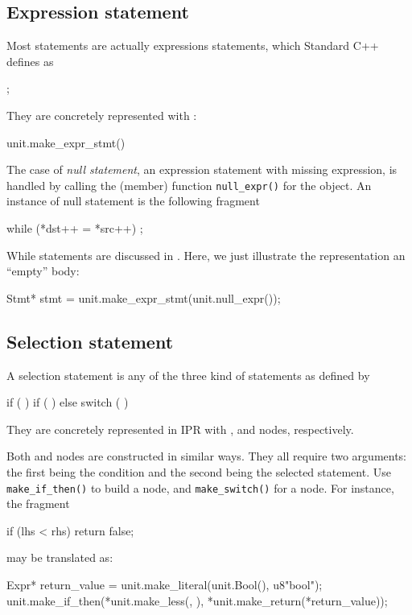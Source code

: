 \documentclass[11pt]{article}
\begin{document}
\subsection{Expression statement}
\label{sec:stmt.expr}
Most statements are actually expressions statements, which Standard C++ 
defines as
\begin{Grammar}
       ;
\end{Grammar}

They are concretely represented with :
\begin{Program}
           unit.make_expr_stmt()
\end{Program}
The case of \emph{null statement}, \ie{} an expression statement with
missing expression, is handled by calling the (member) function
\verb=null_expr()= for the  object.  An instance of null
statement is the following fragment
\begin{Program}
  while (*dst++ = *src++)
     ;
\end{Program}
While statements are discussed in .  Here, we
just illustrate the representation an ``empty'' body:
\begin{Program}
  Stmt* stmt = unit.make_expr_stmt(unit.null_expr());
\end{Program}

\subsection{Selection statement}
\label{sec:stmt.selection}

A selection statement is any of the three kind of statements as defined by 
\begin{Grammar}
      if (  ) 
      if (  )  else 
      switch (  ) 
\end{Grammar}
They are concretely represented in IPR with ,
 and  nodes,
respectively. 

Both  and  nodes are
constructed in similar ways. They all require two arguments: the first being
the condition and the second being the selected statement.  Use
\texttt{make\_if\_then()} to build a  node, and
\texttt{make\_switch()} for a   node.
 For instance, the fragment
\begin{Program}
  if (lhs < rhs)
     return false;
\end{Program}
may be translated as:
\begin{Program}
  Expr* return_value = unit.make_literal(unit.Bool(), u8"bool");
  unit.make_if_then(*unit.make_less(, ),
                    *unit.make_return(*return_value));
\end{Program}
\end{document}
